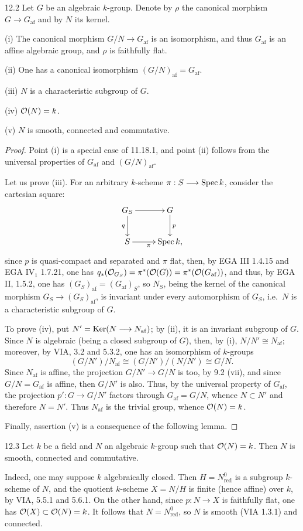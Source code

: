 \begin{theorem}{12.2}\label{VIB.12.2}
Let $G$ be an algebraic $k$-group. Denote by $\rho$ the canonical morphism $G\to G_{\mathrm{af}}$ and by $N$ its kernel.

(i) The canonical morphism $G/N\to G_{\mathrm{af}}$ is an isomorphism, and thus $G_{\mathrm{af}}$ is an affine algebraic group, and $\rho$ is faithfully flat.

(ii) One has a canonical isomorphism $(G/N)_{\mathrm{af}}=G_{\mathrm{af}}$.

(iii) $N$ is a characteristic subgroup of $G$.

(iv) $\mathcal{O}(N)=k$.

(v) $N$ is smooth, connected and commutative.
\end{theorem}
\begin{proof}
Point (i) is a special case of 11.18.1, and point (ii) follows from the universal properties of $G_{\mathrm{af}}$ and $(G/N)_{\mathrm{af}}$.

Let us prove (iii). For an arbitrary $k$-scheme $\pi:S\longrightarrow\operatorname{Spec} k$, consider the cartesian square:
\[
\xymatrix{G_S\ar[r]\ar[d]_q&G\ar[d]^p\\S\ar[r]_\pi&\Spec k,}
\]
since $p$ is quasi-compact and separated and $\pi$ flat, then, by EGA III 1.4.15 and EGA IV$_1$ 1.7.21, one has $q_*(\mathcal{O}_{G_S})=\pi^*(\mathcal{O}(G))=\pi^*(\mathcal{O}(G_{\mathrm{af}}))$, and thus, by EGA II, 1.5.2, one has $(G_S)_{\mathrm{af}}=(G_{\mathrm{af}})_S$, so $N_S$, being the kernel of the canonical morphism $G_S\to(G_S)_{\mathrm{af}}$, is invariant under every automorphism of $G_S$, i.e.\ $N$ is a characteristic subgroup of $G$.

To prove (iv), put $N'=\operatorname{Ker}(N\longrightarrow N_{\mathrm{af}})$; by (ii), it is an invariant subgroup of $G$. Since $N$ is algebraic (being a closed subgroup of $G$), then, by (i), $N/N'\cong N_{\mathrm{af}}$; moreover, by VIA, 3.2 and 5.3.2, one has an isomorphism of $k$-groups
\[
(G/N')/N_{\mathrm{af}}\cong(G/N')/(N/N')\cong G/N.
\]
Since $N_{\mathrm{af}}$ is affine, the projection $G/N'\to G/N$ is too, by 9.2 (vii), and since $G/N=G_{\mathrm{af}}$ is affine, then $G/N'$ is also. Thus, by the universal property of $G_{\mathrm{af}}$, the projection $p':G\to G/N'$ factors through $G_{\mathrm{af}}=G/N$, whence $N\subset N'$ and therefore $N=N'$. Thus $N_{\mathrm{af}}$ is the trivial group, whence $\mathcal{O}(N)=k$.

Finally, assertion (v) is a consequence of the following lemma.
\end{proof}
\begin{lemma}{12.3}\label{VIB.12.3}
Let $k$ be a field and $N$ an algebraic $k$-group such that $\mathcal{O}(N)=k$. Then $N$ is smooth, connected and commutative.
\end{lemma}
Indeed, one may suppose $k$ algebraically closed. Then $H=N^0_{\mathrm{red}}$ is a subgroup $k$-scheme of $N$, and the quotient $k$-scheme $X=N/H$ is finite (hence affine) over $k$, by VIA, 5.5.1 and 5.6.1. On the other hand, since $p:N\to X$ is faithfully flat, one has $\mathcal{O}(X)\subset\mathcal{O}(N)=k$. It follows that $N=N^0_{\mathrm{red}}$, so $N$ is smooth (VIA 1.3.1) and connected.

